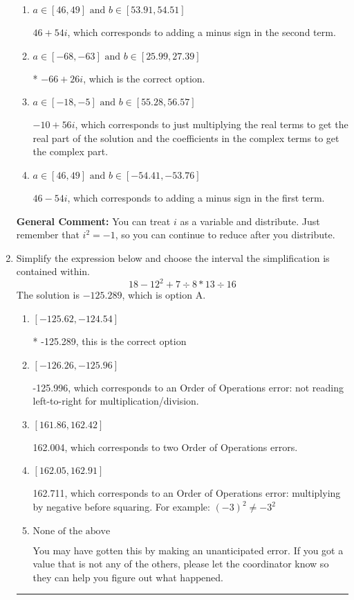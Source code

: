 \documentclass{extbook}[14pt]
\newcommand{\litem}[1]{\item #1

\rule{\textwidth}{0.4pt}}
\begin{document}
\begin{enumerate}
{\begin{enumerate}[label=\Alph*.]
 $-66 - 26 i$, which corresponds to adding a minus sign in both terms.
\item \( a \in [46, 49] \text{ and } b \in [53.91, 54.51] \)

 $46 + 54 i$, which corresponds to adding a minus sign in the second term.
\item \( a \in [-68, -63] \text{ and } b \in [25.99, 27.39] \)

* $-66 + 26 i$, which is the correct option.
\item \( a \in [-18, -5] \text{ and } b \in [55.28, 56.57] \)

 $-10 + 56 i$, which corresponds to just multiplying the real terms to get the real part of the solution and the coefficients in the complex terms to get the complex part.
\item \( a \in [46, 49] \text{ and } b \in [-54.41, -53.76] \)

 $46 - 54 i$, which corresponds to adding a minus sign in the first term.
\end{enumerate}

\textbf{General Comment:} You can treat $i$ as a variable and distribute. Just remember that $i^2=-1$, so you can continue to reduce after you distribute.
}
\litem{
Simplify the expression below and choose the interval the simplification is contained within.
\[ 18 - 12^2 + 7 \div 8 * 13 \div 16 \]The solution is \( -125.289 \), which is option A.\begin{enumerate}[label=\Alph*.]
\item \( [-125.62, -124.54] \)

* -125.289, this is the correct option
\item \( [-126.26, -125.96] \)

 -125.996, which corresponds to an Order of Operations error: not reading left-to-right for multiplication/division.
\item \( [161.86, 162.42] \)

 162.004, which corresponds to two Order of Operations errors.
\item \( [162.05, 162.91] \)

 162.711, which corresponds to an Order of Operations error: multiplying by negative before squaring. For example: $(-3)^2 \neq -3^2$
\item \( \text{None of the above} \)

 You may have gotten this by making an unanticipated error. If you got a value that is not any of the others, please let the coordinator know so they can help you figure out what happened.
\end{enumerate}

}
\end{enumerate}
\end{document}
